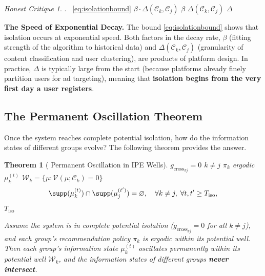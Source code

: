 \documentclass[11pt,a4paper]{article}
\newtheorem{theorem}{Theorem}[section]
\theoremstyle{remark}
\newtheorem{honestattack}{Honest Critique}
\newenvironment{attackbox}{%
  \begin{center}
  \color{red}
  \begin{minipage}{0.92\textwidth}
  \begin{honestattack}
}{%
  \end{honestattack}
  \end{minipage}
  \end{center}
}
\newcommand{\GCoupling}{g_{\text{cross}}}
\newcommand{\CoordSys}{\mathcal{C}}
\newcommand{\InfoPE}{\mathcal{V}}
\begin{document}
\begin{attackbox}
  \textbf{}.
  ~\eqref{eq:isolationbound} 
   $\beta \cdot \Delta(\CoordSys_k, \CoordSys_j)$ 
  $\beta$ 
  $\Delta(\CoordSys_k, \CoordSys_j)$ 
  $\Delta$ 
  \textbf{}

  \textbf{The Speed of Exponential Decay.}
  The bound \eqref{eq:isolationbound} shows that isolation occurs at exponential speed.
  Both factors in the decay rate, $\beta$ (fitting strength of the algorithm to
  historical data) and $\Delta(\CoordSys_k, \CoordSys_j)$ (granularity of content
  classification and user clustering), are products of platform design.
  In practice, $\Delta$ is typically large from the start (because platforms already
  finely partition users for ad targeting), meaning that \textbf{isolation begins from
  the very first day a user registers}.
\end{attackbox}

\subsection{}

\subsection{The Permanent Oscillation Theorem}



Once the system reaches complete potential isolation, how do the information states of
different groups evolve? The following theorem provides the answer.

\begin{theorem}[ Permanent Oscillation in IPE Wells]
\label{thm:oscillation}
$\GCoupling_{kj} = 0$  $k \neq j$
 $\pi_k$ ergodic
 $\mu_k^{(t)}$  $\mathcal{W}_k = \{\mu : \InfoPE(\mu; \CoordSys_k) = 0\}$
\textbf{}
\[
\supp(\mu_k^{(t)}) \cap \supp(\mu_j^{(t')}) = \varnothing, \quad
\forall k \neq j, \; \forall t, t' \geq T_{\text{iso}},
\]
 $T_{\text{iso}}$ 

Assume the system is in complete potential isolation ($\GCoupling_{kj} = 0$ for all
$k \neq j$), and each group's recommendation policy $\pi_k$ is ergodic within its
potential well. Then each group's information state $\mu_k^{(t)}$ oscillates permanently
within its potential well $\mathcal{W}_k$, and the information states of different
groups \textbf{never intersect}.
\end{theorem}
\end{document}

